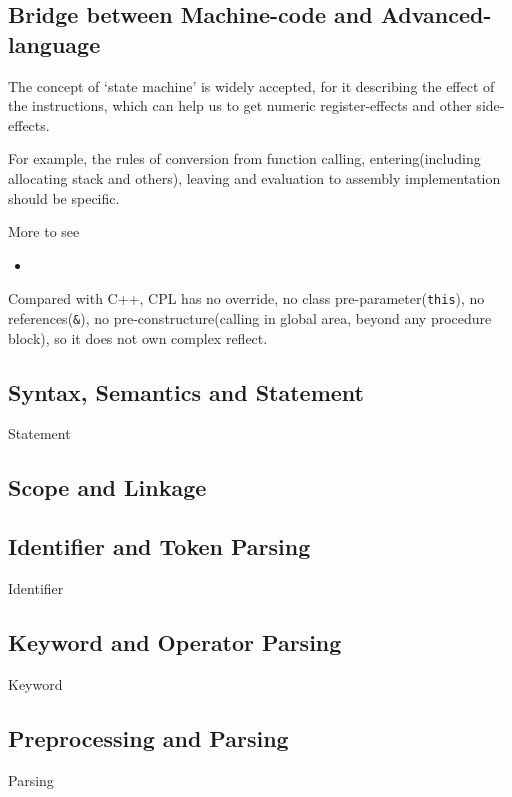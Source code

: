 
\subsection{Bridge between Machine-code and Advanced-language}

The concept of `state machine' is widely accepted, for it describing the effect of the instructions, which can help us to get numeric register-effects and other side-effects.

For example, the rules of conversion from function calling, entering(including allocating stack and others), leaving and evaluation to assembly implementation should be specific.

More to see
\begin{itemize}
	\item {}
\end{itemize}

Compared with C++, CPL has
no override,
no class pre-parameter(\verb`this`), 
no references(\verb`&`),
no pre-constructure(calling in global area, beyond any procedure block), %
so it does not own complex reflect.

\subsection{Syntax, Semantics and Statement} %
{Statement}

\subsection{Scope and Linkage}

\subsection{Identifier and Token Parsing}
{Identifier}

\subsection{Keyword and Operator Parsing}
{Keyword}


\subsection{Preprocessing and Parsing}
{Parsing}

